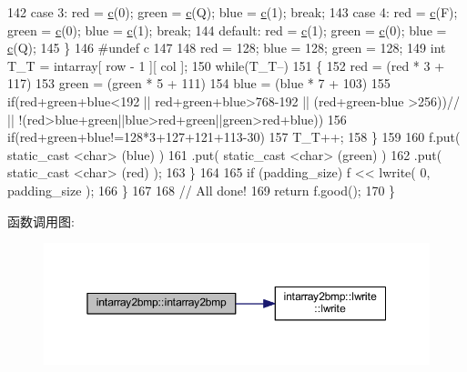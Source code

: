 \begin{DoxyCode}
142           \textcolor{keywordflow}{case} 3:  red = \hyperlink{IntArray2bmp_8h_ae9d8014c37dbf37873bdee6b8497a065}{c}(0);  green = \hyperlink{IntArray2bmp_8h_ae9d8014c37dbf37873bdee6b8497a065}{c}(Q);  blue = \hyperlink{IntArray2bmp_8h_ae9d8014c37dbf37873bdee6b8497a065}{c}(1);  \textcolor{keywordflow}{break};
143           \textcolor{keywordflow}{case} 4:  red = \hyperlink{IntArray2bmp_8h_ae9d8014c37dbf37873bdee6b8497a065}{c}(F);  green = \hyperlink{IntArray2bmp_8h_ae9d8014c37dbf37873bdee6b8497a065}{c}(0);  blue = \hyperlink{IntArray2bmp_8h_ae9d8014c37dbf37873bdee6b8497a065}{c}(1);  \textcolor{keywordflow}{break};
144           \textcolor{keywordflow}{default}: red = \hyperlink{IntArray2bmp_8h_ae9d8014c37dbf37873bdee6b8497a065}{c}(1);  green = \hyperlink{IntArray2bmp_8h_ae9d8014c37dbf37873bdee6b8497a065}{c}(0);  blue = \hyperlink{IntArray2bmp_8h_ae9d8014c37dbf37873bdee6b8497a065}{c}(Q);
145           \}
146 \textcolor{preprocessor}{        #undef c}
147 
148           red = 128; blue = 128; green = 128;
149           \textcolor{keywordtype}{int} T\_T = intarray[ row - 1 ][ col ];
150           \textcolor{keywordflow}{while}(T\_T--)
151           \{
152             red = (red * 3 + 117) %
153             green = (green * 5 + 111) %
154             blue = (blue * 7 + 103) %
155             \textcolor{keywordflow}{if}(red+green+blue<192 || red+green+blue>768-192 || (red+green-blue >256))\textcolor{comment}{// ||
       !(red>blue+green||blue>red+green||green>red+blue))}
156               \textcolor{keywordflow}{if}(red+green+blue!=128*3+127+121+113-30)
157                 T\_T++;
158           \}
159 
160         f.put( static\_cast <char> (blue)  )
161          .put( static\_cast <char> (green) )
162          .put( static\_cast <char> (red)   );
163         \}
164 
165       \textcolor{keywordflow}{if} (padding\_size) f << lwrite( 0, padding\_size );
166       \}
167 
168     \textcolor{comment}{// All done!}
169     \textcolor{keywordflow}{return} f.good();
170     \}
\end{DoxyCode}


函数调用图\+:
\nopagebreak
\begin{figure}[H]
\begin{center}
\leavevmode
\includegraphics[width=350pt]{namespaceintarray2bmp_a504dc3b703d9a772b4d6bf1017234f49_cgraph}
\end{center}
\end{figure}




